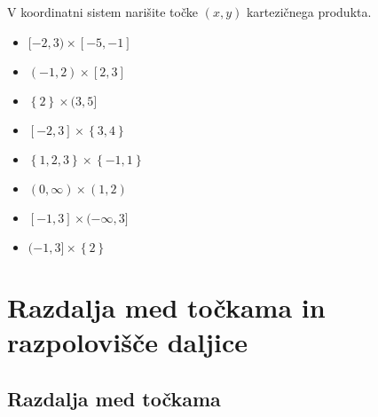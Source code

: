         \begin{naloga}
            V koordinatni sistem narišite točke $(x,y)$ kartezičnega produkta.
            \begin{itemize}
                \item $[-2,3)\times[-5,-1]$
                \item $(-1,2)\times[2,3]$
                \item $\left\{2\right\}\times(3,5]$
                \item $[-2,3]\times\left\{3,4\right\}$
                \item $\left\{1,2,3\right\}\times\left\{-1,1\right\}$
                \item $(0,\infty)\times(1,2)$
                \item $[-1,3]\times(-\infty,3]$
                \item $(-1,3]\times\left\{2\right\}$
            \end{itemize}
        \end{naloga}

    





\newpage

    \section{Razdalja med točkama in razpolovišče daljice}

    
        \subsection*{Razdalja med točkama}

